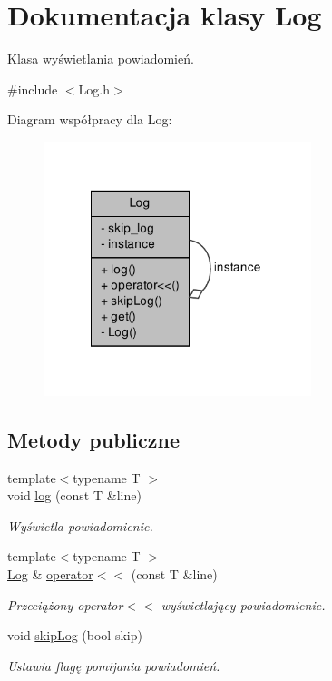 \hypertarget{class_log}{\section{\-Dokumentacja klasy \-Log}
\label{class_log}
}


\-Klasa wyświetlania powiadomień.  




{\ttfamily \#include $<$\-Log.\-h$>$}



\-Diagram współpracy dla \-Log\-:\nopagebreak
\begin{figure}[H]
\begin{center}
\leavevmode
\includegraphics[width=221pt]{class_log__coll__graph}
\end{center}
\end{figure}
\subsection*{\-Metody publiczne}
\begin{DoxyCompactItemize}
\item 
{\footnotesize template$<$typename T $>$ }\\void \hyperlink{class_log_ad0fd212d5228a803e50201c3764ab452}{log} (const \-T \&line)
\begin{DoxyCompactList}\small\item\em \-Wyświetla powiadomienie. \end{DoxyCompactList}\item 
{\footnotesize template$<$typename T $>$ }\\\hyperlink{class_log}{\-Log} \& \hyperlink{class_log_a7aff739c7ab3f31d9a36e352536d8846}{operator$<$$<$} (const \-T \&line)
\begin{DoxyCompactList}\small\item\em \-Przeciążony operator$<$$<$ wyświetlający powiadomienie. \end{DoxyCompactList}\item 
void \hyperlink{class_log_a05e2ce270e9b446a06cbce6044038a3d}{skip\-Log} (bool skip)
\begin{DoxyCompactList}\small\item\em \-Ustawia flagę pomijania powiadomień. \end{DoxyCompactList}\end{DoxyCompactItemize}

